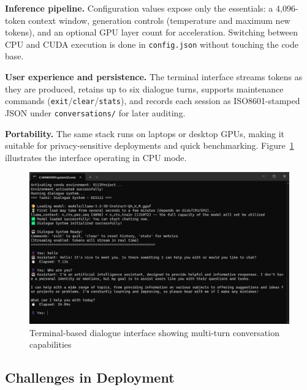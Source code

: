 \documentclass[12pt,a4paper]{article}
\begin{document}
\noindent\textbf{Inference pipeline.} Configuration values expose only the essentials: a 4,096-token context window, generation controls (temperature and maximum new tokens), and an optional GPU layer count for acceleration. Switching between CPU and CUDA execution is done in \texttt{config.json} without touching the code base.

\noindent\textbf{User experience and persistence.} The terminal interface streams tokens as they are produced, retains up to six dialogue turns, supports maintenance commands (\texttt{exit}/\texttt{clear}/\texttt{stats}), and records each session as ISO8601-stamped JSON under \texttt{conversations/} for later auditing.

\noindent\textbf{Portability.} The same stack runs on laptops or desktop GPUs, making it suitable for privacy-sensitive deployments and quick benchmarking. Figure~\ref{fig:llama_cpu_chat} illustrates the interface operating in CPU mode.

\begin{figure}[H]
    \centering
    \includegraphics[width=0.95\linewidth]{Figures/llama对话.png}
    \caption{Terminal-based dialogue interface showing multi-turn conversation capabilities}
    \label{fig:llama_cpu_chat}
\end{figure}


\subsection{Challenges in Deployment}
\end{document}
